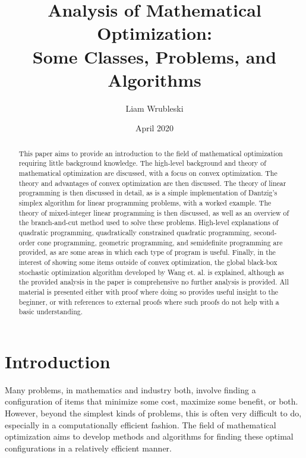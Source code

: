 \documentclass[10pt]{article}
\title{Analysis of Mathematical Optimization:\\Some Classes, Problems, and Algorithms}
\author{Liam Wrubleski}
\date{April 2020}
\begin{document}
\maketitle

\begin{abstract}
This paper aims to provide an introduction to the field of mathematical optimization requiring little background knowledge. The high-level background and theory of mathematical optimization are discussed, with a focus on convex optimization. The theory and advantages of convex optimization are then discussed. The theory of linear programming is then discussed in detail, as is a simple implementation of Dantzig's simplex algorithm for linear programming problems, with a worked example. The theory of mixed-integer linear programming is then discussed, as well as an overview of the branch-and-cut method used to solve these problems. High-level explanations of quadratic programming, quadratically constrained quadratic programming, second-order cone programming, geometric programming, and semidefinite programming are provided, as are some areas in which each type of program is useful. Finally, in the interest of showing some items outside of convex optimization, the global black-box stochastic optimization algorithm developed by Wang et. al. is explained, although as the provided analysis in the paper is comprehensive no further analysis is provided. All material is presented either with proof where doing so provides useful insight to the beginner, or with references to external proofs where such proofs do not help with a basic understanding.
\end{abstract}

\section{Introduction}
Many problems, in mathematics and industry both, involve finding a configuration of items that minimize some cost, maximize some benefit, or both. However, beyond the simplest kinds of problems, this is often very difficult to do, especially in a computationally efficient fashion. The field of mathematical optimization aims to develop methods and algorithms for finding these optimal configurations in a relatively efficient manner.
\end{document}
